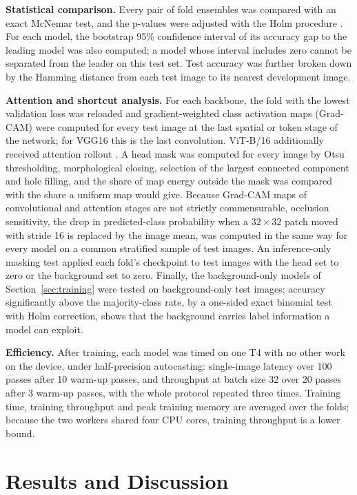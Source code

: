 \documentclass[final,3p,times,number]{elsarticle}
\begin{document}
\textbf{Statistical comparison.} Every pair of fold ensembles was compared with an exact McNemar test, and the p-values were adjusted with the Holm procedure \cite{holm1979}. For each model, the bootstrap 95\% confidence interval of its accuracy gap to the leading model was also computed; a model whose interval includes zero cannot be separated from the leader on this test set. Test accuracy was further broken down by the Hamming distance from each test image to its nearest development image.

\textbf{Attention and shortcut analysis.} For each backbone, the fold with the lowest validation loss was reloaded and gradient-weighted class activation maps (Grad-CAM) \cite{selvaraju2017} were computed for every test image at the last spatial or token stage of the network; for VGG16 this is the last convolution. ViT-B/16 additionally received attention rollout \cite{abnar2020}. A head mask was computed for every image by Otsu thresholding, morphological closing, selection of the largest connected component and hole filling, and the share of map energy outside the mask was compared with the share a uniform map would give. Because Grad-CAM maps of convolutional and attention stages are not strictly commensurable, occlusion sensitivity, the drop in predicted-class probability when a $32\times 32$ patch moved with stride 16 is replaced by the image mean, was computed in the same way for every model on a common stratified sample of test images. An inference-only masking test applied each fold's checkpoint to test images with the head set to zero or the background set to zero. Finally, the background-only models of Section~\ref{sec:training} were tested on background-only test images; accuracy significantly above the majority-class rate, by a one-sided exact binomial test with Holm correction, shows that the background carries label information a model can exploit.

\textbf{Efficiency.} After training, each model was timed on one T4 with no other work on the device, under half-precision autocasting: single-image latency over 100 passes after 10 warm-up passes, and throughput at batch size 32 over 20 passes after 3 warm-up passes, with the whole protocol repeated three times. Training time, training throughput and peak training memory are averaged over the folds; because the two workers shared four CPU cores, training throughput is a lower bound.

\section{Results and Discussion}
\label{sec:results}
\end{document}
